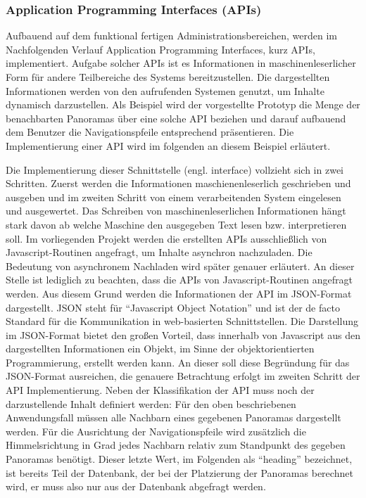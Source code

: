 \subsubsection{Application Programming Interfaces (APIs)}
\label{sec:APIs}

Aufbauend auf dem funktional fertigen Administrationsbereichen, werden im Nachfolgenden Verlauf Application Programming Interfaces, kurz APIs, implementiert. Aufgabe solcher APIs ist es Informationen in maschinenleserlicher Form für andere Teilbereiche des Systems bereitzustellen. Die dargestellten Informationen werden von den aufrufenden Systemen genutzt, um Inhalte dynamisch darzustellen. Als Beispiel wird der vorgestellte Prototyp die Menge der benachbarten Panoramas über eine solche API beziehen und darauf aufbauend dem Benutzer die Navigationspfeile entsprechend präsentieren. Die Implementierung einer API wird im folgenden an diesem Beispiel erläutert.

Die Implementierung dieser Schnittstelle (engl. interface) vollzieht sich in zwei Schritten. Zuerst werden die Informationen maschienenleserlich geschrieben und ausgeben und im zweiten Schritt von einem verarbeitenden System eingelesen und ausgewertet. Das Schreiben von maschinenleserlichen Informationen hängt stark davon ab welche Maschine den ausgegeben Text lesen bzw. interpretieren soll. Im vorliegenden Projekt werden die erstellten APIs ausschließlich von Javascript-Routinen angefragt, um Inhalte asynchron nachzuladen. Die Bedeutung von asynchronem Nachladen wird später genauer erläutert. An dieser Stelle ist lediglich zu beachten, dass die APIs von Javascript-Routinen angefragt werden. Aus diesem Grund werden die Informationen der API im JSON-Format dargestellt. JSON steht für "`Javascript Object Notation"' und ist der de facto Standard für die Kommunikation in web-basierten Schnittstellen. Die Darstellung im JSON-Format bietet den großen Vorteil, dass innerhalb von Javascript aus den dargestellten Informationen ein Objekt, im Sinne der objektorientierten Programmierung\footnotemark, erstellt werden kann. An dieser soll diese Begründung für das JSON-Format ausreichen, die genauere Betrachtung erfolgt im zweiten Schritt der API Implementierung. Neben der Klassifikation der API muss noch der darzustellende Inhalt definiert werden: Für den oben beschriebenen Anwendungsfall müssen alle Nachbarn eines gegebenen Panoramas dargestellt werden. Für die Ausrichtung der Navigationspfeile wird zusätzlich die Himmelsrichtung in Grad jedes Nachbarn relativ zum Standpunkt des gegeben Panoramas benötigt. Dieser letzte Wert, im Folgenden als "`heading"' bezeichnet, ist bereits Teil der Datenbank, der bei der Platzierung der Panoramas berechnet wird, er muss also nur aus der Datenbank abgefragt werden.

